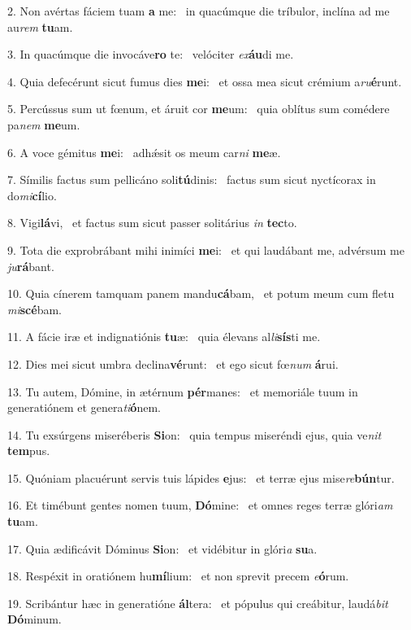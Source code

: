 2. Non avértas fáciem tuam \textbf{a} me: \ast\  in quacúmque die tríbulor, inclína ad me au\textit{rem} \textbf{tu}am.\

3. In quacúmque die invocáve\textbf{ro} te: \ast\  velóciter \textit{ex}\textbf{áu}di me.\

4. Quia defecérunt sicut fumus dies \textbf{me}i: \ast\  et ossa mea sicut crémium a\textit{ru}\textbf{é}runt.\

5. Percússus sum ut fœnum, et áruit cor \textbf{me}um: \ast\  quia oblítus sum comédere pa\textit{nem} \textbf{me}um.\

6. A voce gémitus \textbf{me}i: \ast\  adhǽsit os meum car\textit{ni} \textbf{me}æ.\

7. Símilis factus sum pellicáno soli\textbf{tú}dinis: \ast\  factus sum sicut nyctícorax in do\textit{mi}\textbf{cí}lio.\

8. Vigi\textbf{lá}vi, \ast\  et factus sum sicut passer solitárius \textit{in} \textbf{tec}to.\

9. Tota die exprobrábant mihi inimíci \textbf{me}i: \ast\  et qui laudábant me, advérsum me \textit{ju}\textbf{rá}bant.\

10. Quia cínerem tamquam panem mandu\textbf{cá}bam, \ast\  et potum meum cum fletu \textit{mi}\textbf{scé}bam.\

11. A fácie iræ et indignatiónis \textbf{tu}æ: \ast\  quia élevans al\textit{li}\textbf{sís}ti me.\

12. Dies mei sicut umbra declina\textbf{vé}runt: \ast\  et ego sicut fœ\textit{num} \textbf{á}rui.\

13. Tu autem, Dómine, in ætérnum \textbf{pér}manes: \ast\  et memoriále tuum in generatiónem et genera\textit{ti}\textbf{ó}nem.\

14. Tu exsúrgens miseréberis \textbf{Si}on: \ast\  quia tempus miseréndi ejus, quia ve\textit{nit} \textbf{tem}pus.\

15. Quóniam placuérunt servis tuis lápides \textbf{e}jus: \ast\  et terræ ejus mise\textit{re}\textbf{bún}tur.\

16. Et timébunt gentes nomen tuum, \textbf{Dó}mine: \ast\  et omnes reges terræ glóri\textit{am} \textbf{tu}am.\

17. Quia ædificávit Dóminus \textbf{Si}on: \ast\  et vidébitur in glóri\textit{a} \textbf{su}a.\

18. Respéxit in oratiónem hu\textbf{mí}lium: \ast\  et non sprevit precem \textit{e}\textbf{ó}rum.\

19. Scribántur hæc in generatióne \textbf{ál}tera: \ast\  et pópulus qui creábitur, laudá\textit{bit} \textbf{Dó}minum.\

